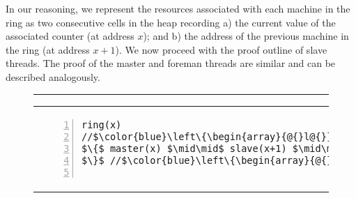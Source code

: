 In our reasoning, we represent the resources associated with each
machine in the ring as two consecutive cells in the heap recording a)
the current value of the associated counter (at address $x$); and b)
the address of the previous machine in the ring (at address $x+1$).
We now proceed with the proof outline of slave threads. The proof of
the master and foreman threads are similar and can be described
analogously.

\begin{figure}
\centering
\noindent\hrule\vspace{10pt}
\vspace{-3ex}
\begin{tabular}{@{} l @{\hspace{4ex}} l@{}}
{\begin{lstlisting}[numbers=left,numbersep=5pt]
ring(x)
//$\color{blue}\left\{\begin{array}{@{}l@{}}\tx{x}|-< x * [\token m_{x,2}] * [\token s_{x{+}1}] * [\token s_{x{+}2}]*\null\\ \shared{\begin{array}{@{}l@{}}\tx{n}|-<n * x|->0 * x{+}1|->0 * x{+}2|->0\end{array}}{I}\end{array} \right\}$
$\{$ master(x) $\mid\mid$ slave(x+1) $\mid\mid$ slave(x+2);
$\}$ //$\color{blue}\left\{\begin{array}{@{}l@{}}\tx{x}|-< x * [\token m_{x,2}] * [\token s_{x{+}1}] * [\token s_{x{+}2}]*\null\\ \shared{\begin{array}{@{}l@{}}\tx{n}|-<n * x|->10 * x{+}1|->10 * x{+}2|->10\end{array}}{I}\end{array} \right\}$


\end{lstlisting}}
\end{tabular}
\end{figure}
